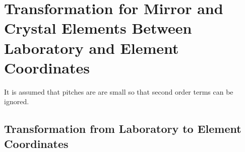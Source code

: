 \section[Mirror and Crystal Element Transformation]
{Transformation for Mirror and Crystal Elements Between 
Laboratory and Element Coordinates}
\label{s:photon.lab.ele}

It is assumed that pitches are are small so that second
order terms can be ignored.

\subsection{Transformation from Laboratory to Element Coordinates}
\label{ss:crystal.trans.le}

